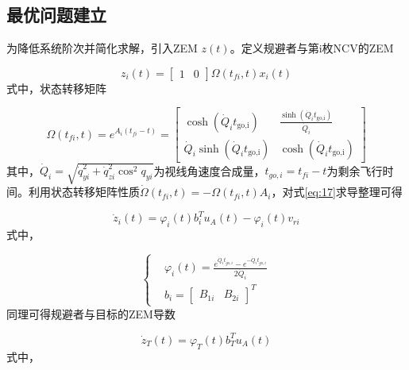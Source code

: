 \subsection{最优问题建立}
为降低系统阶次并简化求解，引入ZEM $z(t)$。定义规避者与第i枚NCV的ZEM

\begin{equation}
\label{eq:17}
{z_i}(t) = \left[ {\begin{array}{*{20}{c}}
  1&0 
\end{array}} \right]\Omega \left( {{t_{fi}},t} \right){x_i}(t)
\end{equation}
式中，状态转移矩阵

\begin{equation}
\label{eq:18}
\Omega \left( {{t_{fi}},t} \right) = {e^{{A_i}\left( {{t_{fi}} - t} \right)}} = \left[ {\begin{array}{*{20}{c}}
  {\cosh ({{\dot Q}_i}{t_{{\text{go,i}}}})}&{\frac{{\sinh ({{\dot Q}_i}{t_{{\text{go,i}}}})}}{{{{\dot Q}_i}}}} \\ 
  {{{\dot Q}_i}\sinh ({{\dot Q}_i}{t_{{\text{go,i}}}})}&{\cosh ({{\dot Q}_i}{t_{{\text{go,i}}}})} 
\end{array}} \right]
\end{equation}
其中，${\dot Q_i} = \sqrt {\dot q_{yi}^2 + \dot q_{zi}^2{{\cos }^2}{q_{yi}}} $为视线角速度合成量，${t_{go,i}} = {t_{fi}} - t$为剩余飞行时间。利用状态转移矩阵性质$\dot \Omega \left( {{t_{fi}},t} \right) =  - \Omega \left( {{t_{fi}},t} \right){A_i}$，对式\eqref{eq:17}求导整理可得

\begin{equation}
\label{eq:19}
{\dot z_i}(t) = {\varphi _i}(t)b_i^T{u_A}(t) - {\varphi _i}(t){v_{ri}}
\end{equation}
式中，

\begin{equation}
\label{eq:20}
\left\{
\begin{aligned}
& {\varphi _i}(t) = \frac{{{e^{{{\dot Q}_i}{t_{go,i}}}} - {e^{ - {{\dot Q}_i}{t_{go,i}}}}}}{{2{{\dot Q}_i}}} \\
& {b_i} = {\left[ {\begin{array}{*{20}{c}}
  {{B_{1i}}}&{{B_{2i}}}
\end{array}} \right]^T}
\end{aligned}
\right.
\end{equation}
同理可得规避者与目标的ZEM导数

\begin{equation}
\label{eq:21}
{\dot z_T}(t) = {\varphi _T}(t)b_T^T{u_A}(t)
\end{equation}
式中，


